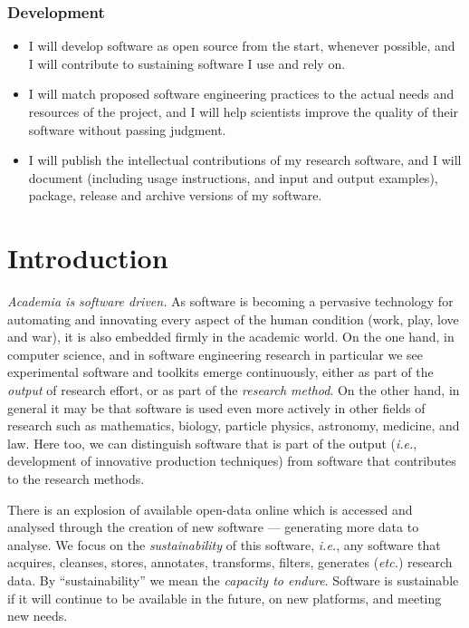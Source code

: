 \documentclass[a4paper,UKenglish]{dagman}
\renewcommand{\paragraph}[1]{\subsubsection*{#1}\xspace}
\newcommand{\ie}{\emph{i.e.},\xspace}
\newcommand{\etc}{\emph{etc.}\xspace}
\begin{document}
\paragraph{Development}
\begin{itemize}
\item I will develop software as open source from the start, whenever possible, and I will contribute to sustaining software I use and rely on.
\item I will match proposed software engineering practices to the actual needs and resources of the project, and I will help scientists improve the quality of their software without passing judgment.
\item I will publish the intellectual contributions of my research software, and I will document (including usage instructions, and input and output examples), package, release and archive versions of my software.
\end{itemize}

\tableofcontents

\section{Introduction}

\emph{Academia is software driven.} As software is becoming a pervasive technology for automating and innovating every aspect of the human condition (work, play, love and war), it is also embedded firmly in the academic world. On the one hand, in computer science, and in software engineering research in particular we see experimental software and toolkits emerge continuously, either as part of the \emph{output} of research effort, or as part of the \emph{research method}. On the other hand, in general it may be that software is used even more actively in other fields of research such as mathematics, biology, particle physics, astronomy, medicine, and law. Here too, we can distinguish software that is part of the output (\ie development of innovative production techniques) from software that contributes to the research methods. 

There is an explosion of available open-data online which is accessed and analysed through the creation of new software --- generating more data to analyse. We focus on the \emph{sustainability} of this software, \ie any software that acquires, cleanses, stores, annotates, transforms, filters, generates (\etc) research data.
By ``sustainability'' we mean the \emph{capacity to endure}. Software is sustainable if it will continue to be available in the future, on new platforms, and meeting new needs. 
\end{document}
